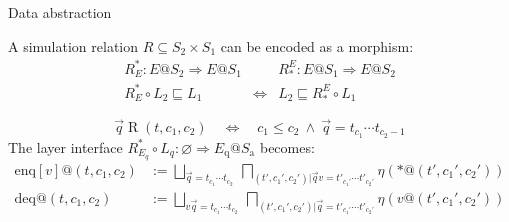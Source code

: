 \documentclass[aspectratio=54]{beamer}
\newcommand{\kw}[1]{\ensuremath{ \mathrm{#1} }}
\begin{document}
\begin{frame}{Data abstraction} %
  \begin{definition}
    A simulation relation $R \subseteq S_2 \times S_1$
    can be encoded as a morphism:
    \[
      \begin{array}{ccc}
        R^*_E : E@S_2 \Rightarrow E@S_1 & &
        R_*^E : E@S_1 \Rightarrow E@S_2 \\[1ex]
        R^*_E \circ L_2 \sqsubseteq L_1 &
        \Leftrightarrow &
        L_2 \sqsubseteq R_*^E \circ L_1
      \end{array}
    \]
  \end{definition}
  \pause
  \begin{example}
    \[
      \vec{q} \mathrel{R} (t, c_1, c_2)
      \quad \Leftrightarrow \quad
      c_1 \le c_2 \:\wedge\:
      \vec{q} = t_{c_1} \cdots t_{c_2 - 1}
    \]
    The layer interface
    $R^*_{E_q} \circ L_q : \varnothing \Rightarrow E_\kw{q}@S_\kw{a}$
    becomes:
    \begin{align*}
      \kw{enq}[v]@(t, c_1, c_2) &:=
        \bigsqcup_{\vec{q} = t_{c_1}\cdots t_{c_2}} \:
        \bigsqcap_{(t', c_1', c_2') | \vec{q}v = t'_{c_1'} \cdots t'_{c_2'}}
        \eta(*@(t', c_1', c_2')) \\
      \kw{deq}@(t, c_1, c_2) &:=
        \bigsqcup_{v\vec{q} = t_{c_1}\cdots t_{c_2}} \:
        \bigsqcap_{(t', c_1', c_2') | \vec{q} = t'_{c_1'} \cdots t'_{c_2'}}
        \eta(v@(t', c_1', c_2'))
    \end{align*}
  \end{example}
\end{frame}
\end{document}
